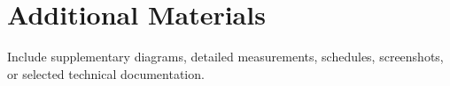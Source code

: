 \appendix
\renewcommand{\chaptername}{PHỤ LỤC}
\chapter{Additional Materials}
Include supplementary diagrams, detailed measurements, schedules, screenshots, or selected technical documentation.
